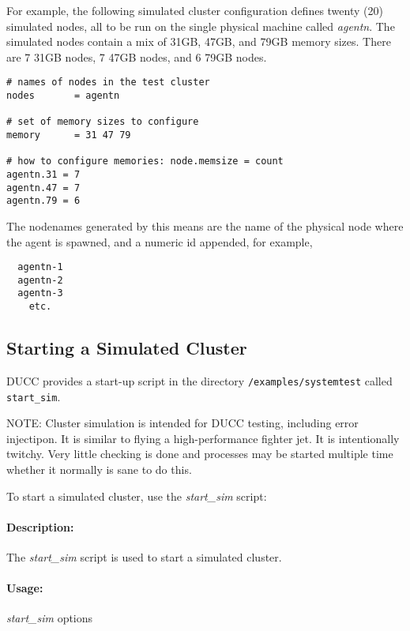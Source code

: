       For example, the following simulated cluster configuration defines twenty (20)
      simulated nodes, all to be run on the single physical machine called {\em agentn}.
      The simulated nodes contain a mix of 31GB, 47GB, and 79GB memory sizes.  There
      are 7 31GB nodes, 7 47GB nodes, and 6 79GB nodes.
\begin{verbatim}
# names of nodes in the test cluster
nodes       = agentn

# set of memory sizes to configure
memory      = 31 47 79

# how to configure memories: node.memsize = count
agentn.31 = 7
agentn.47 = 7
agentn.79 = 6
\end{verbatim}

      The nodenames generated by this means are the name of the physical node where
      the agent is spawned, and a numeric id appended, for example,
\begin{verbatim}
  agentn-1
  agentn-2
  agentn-3
    etc.
\end{verbatim}
      
      \subsection{Starting a Simulated Cluster}
      DUCC provides a start-up script in the directory {\tt \duccruntime/examples/systemtest} 
      called {\tt start\_sim}.  

      NOTE: Cluster simulation is intended for DUCC testing, including error injectipon.  It is
      similar to flying a high-performance fighter jet.  It is intentionally twitchy.  Very little
      checking is done and processes may be started multiple time whether it normally is sane to
      do this.

      To start a simulated cluster, use the {\em start\_sim} script:

      \paragraph{Description:}
      The {\em start\_sim} script is used to start a simulated cluster.
      
      \paragraph{Usage:}
      {\em start\_sim} options

